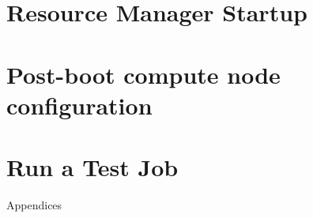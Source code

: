 \documentclass[letterpaper]{article}
\begin{document}
\clearpage
\section{Resource Manager Startup} \label{sec:rms_startup}


\section{Post-boot compute node configuration} \label{sec:post_boot}


\section{Run a Test Job} \label{sec:test_job}


\clearpage
\appendix
{\bf \LARGE \centerline{Appendices}} \vspace*{0.2cm}

\renewcommand{\thesubsection}{\Alph{subsection}}







\end{document}
